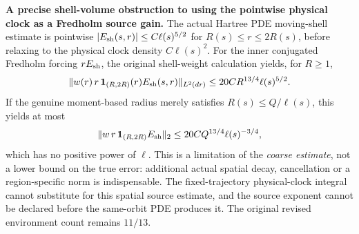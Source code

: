 \documentclass[11pt]{amsart}
\begin{document}
\medskip
\noindent\textbf{A precise shell-volume obstruction to using the pointwise
physical clock as a Fredholm source gain.}
The actual Hartree PDE moving-shell estimate is pointwise
$|E_{\rm sh}(s,r)|\le C\ell(s)^{5/2}$ for
$R(s)\le r\le2R(s)$, before relaxing to the physical
clock density $C\ell(s)^2$.  For the inner conjugated
Fredholm forcing $rE_{\rm sh}$, the original shell-weight calculation
yields, for $R\ge1$,
\[
 \|w(r)\,r\,\mathbf 1_{(R,2R)}(r)E_{\rm sh}(s,r)\|_{L^2(dr)}
 \le20C R^{13/4}\ell(s)^{5/2}.
\]
If the genuine moment-based radius merely satisfies
$R(s)\le Q/\ell(s)$, this yields at most
\[
 \|w\,r\,\mathbf 1_{(R,2R)}E_{\rm sh}\|_2
 \le20 C Q^{13/4}\ell(s)^{-3/4},
\]
which has no positive power of $\ell$.  This is a limitation of the
\emph{coarse estimate}, not a lower bound on the true error:
additional actual spatial decay, cancellation or a region-specific
norm is indispensable. The fixed-trajectory physical-clock integral
cannot substitute for this spatial source estimate, and the source
exponent cannot be declared before the same-orbit PDE produces it.
The original revised environment count remains $11/13$.
\end{document}
